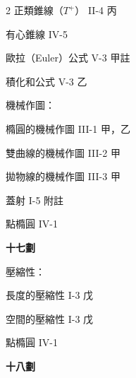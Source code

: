 \begin{multicols}{2}
\noindent\hspace*{1.5em} 正類錐線（$T^+$） \hfill II-4 丙\par
\noindent\hspace*{1.5em} 有心錐線 \hfill IV-5\par
\noindent 歐拉（Euler）公式 \hfill V-3 甲註\par
\noindent 積化和公式 \hfill V-3 乙\par
\noindent 機械作圖：\par
\noindent\hspace*{1.5em} 橢圓的機械作圖 \hfill III-1 甲，乙\par
\noindent\hspace*{1.5em} 雙曲線的機械作圖 \hfill III-2 甲\par
\noindent\hspace*{1.5em} 拋物線的機械作圖 \hfill III-3 甲\par
\noindent 蓋射 \hfill I-5 附註\par
\noindent 點橢圓 \hfill IV-1\par

\vspace{0.8em}
\begin{center}
\textbf{\large 十七劃}
\end{center}

\noindent 壓縮性：\par
\noindent\hspace*{1.5em} 長度的壓縮性 \hfill I-3 戊\par
\noindent\hspace*{1.5em} 空間的壓縮性 \hfill I-3 戊\par
\noindent 點橢圓 \hfill IV-1\par

\vspace{0.8em}
\begin{center}
\textbf{\large 十八劃}
\end{center}


\end{multicols}
